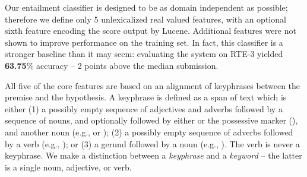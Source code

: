 %
%
Our entailment classifier is designed to be as domain independent as possible;
  therefore we define only 5 unlexicalized real valued features, with an 
  optional sixth feature encoding the score output by Lucene.
Additional features were not shown to improve performance on the training set.
In fact, this classifier is a stronger baseline than it may seem: evaluating
  the system on RTE-3 \cite{key:2007giampiccolo-rte} yielded \textbf{63.75}\% accuracy --
  2 points above the median submission.

All five of the core features are based on an alignment of keyphrases between the
  premise and the hypothesis.
A keyphrase is defined as a span of text which is either
  (1) a possibly empty sequence of adjectives and adverbs followed by a 
      sequence of nouns, and optionally followed by either  or the possessive
      marker (), and another noun (e.g.,  or );
  (2) a possibly empty sequence of adverbs followed by a verb (e.g.,
      ); or
  (3) a gerund followed by a noun (e.g., ).
The verb  is never a keyphrase.
We make a distinction between a \textit{keyphrase} and a \textit{keyword} --
  the latter is a single noun, adjective, or verb.

